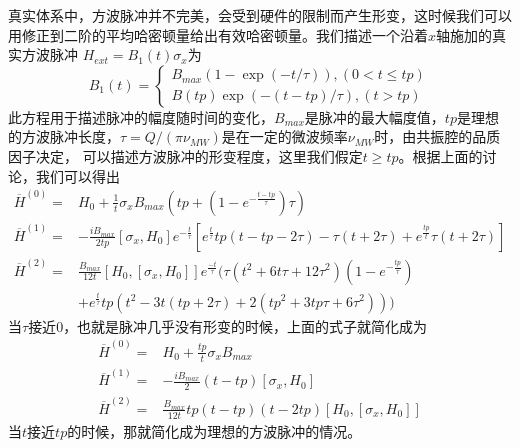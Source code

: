         真实体系中，方波脉冲并不完美，会受到硬件的限制而产生形变\cite{Schweiger_principles}，这时候我们可以用修正到二阶的平均哈密顿量给出有效哈密顿量。我们描述一个沿着$x$轴施加的真实方波脉冲
        $H_{ext}=B_1(t)\sigma_x$为\cite{Hornak1986501}
            \begin{equation}
            \label{real-pulase-shape}
            B_1(t)=\left\{
                     \begin{array}{ll}
                      B_{max}(1-\exp(-t/\tau)),(0<t\leq tp) \\
                      B(tp)\exp(-(t-tp)/\tau), (t>tp)
                     \end{array}
                   \right.
            \end{equation}
        此方程用于描述脉冲的幅度随时间的变化，$B_{max}$是脉冲的最大幅度值，$tp$是理想的方波脉冲长度，$\tau = Q/(\pi \nu_{MW})$是在一定的微波频率$\nu_{MW}$时，由共振腔的品质因子决定，
        可以描述方波脉冲的形变程度，这里我们假定$t\geq tp$。根据上面的讨论，我们可以得出
            \begin{equation}
            \label{real-pulse-AH}
                \begin{split}
                   \overline{H}^{(0)}   =& H_0 + \frac{1}{t}\sigma_x B_{max}(tp+(1-e^{-\frac{t-tp}{\tau}})\tau) \\
                   \overline{H}^{(1)}   =& -\frac{iB_{max}}{2tp}[\sigma_x,H_0]e^{-\frac{t}{\tau}}[e^{\frac{t}{\tau}}tp(t-tp-2\tau)-\tau(t+2\tau)+e^{\frac{tp}{t}}\tau(t+2\tau)]\\
                   \overline{H}^{(2)}   =& \frac{B_{max}}{12t}[H_0,[\sigma_x,H_0]]e^{\frac{-t}{\tau}}(\tau(t^2+6t\tau+12\tau^2)(1-e^{-\frac{tp}{\tau}})\\
                                         & +e^{\frac{t}{\tau}}tp(t^2-3t(tp+2\tau)+2(tp^2+3tp\tau+6\tau^2)))
                \end{split}
            \end{equation}
        当$\tau$接近$0$，也就是脉冲几乎没有形变的时候，上面的式子就简化成为
            \begin{equation}
                \begin{split}
                   \overline{H}^{(0)}   =& H_0 + \frac{tp}{t}\sigma_x B_{max} \\
                   \overline{H}^{(1)}   =& -\frac{iB_{max}}{2}(t-tp)[\sigma_x, H_0]\\
                   \overline{H}^{(2)}   =& \frac{B_{max}}{12t}tp(t-tp)(t-2tp)[H_0,[\sigma_x,H_0]]
                \end{split}
            \end{equation}
        当$t$接近$tp$的时候，那就简化成为理想的方波脉冲的情况。



